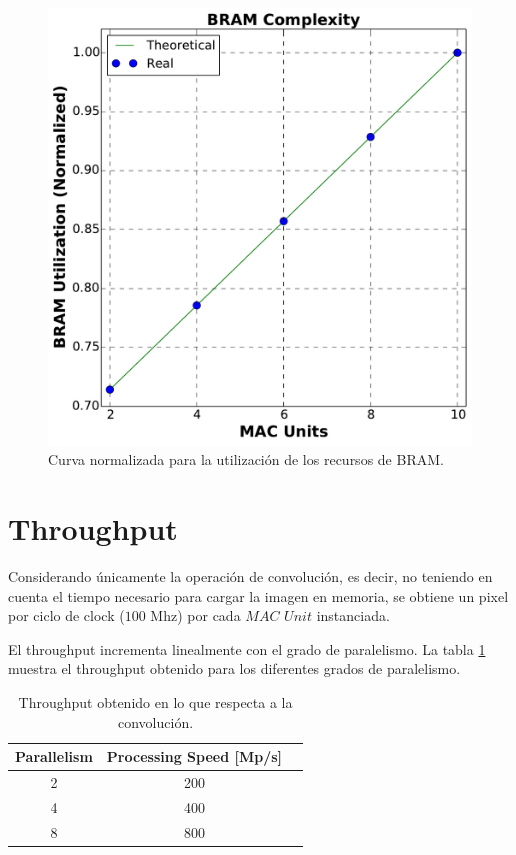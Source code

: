 \begin{figure}
\centering
\includegraphics[scale=0.3]{BRAM_c2}
\caption{Curva normalizada para la utilización de los recursos de BRAM.}
\label{bram_n}
\end{figure}

\section{Throughput}

Considerando únicamente la operación de convolución, es decir, no teniendo en
cuenta el tiempo necesario para cargar la imagen en memoria, se obtiene un pixel
por ciclo de clock ($100$ Mhz) por cada $MAC$ $Unit$ instanciada. 

El throughput incrementa linealmente con el grado de paralelismo. La tabla
\ref{conv_tp} muestra el throughput obtenido para los diferentes grados de
paralelismo.

\begin{table}
\renewcommand{\arraystretch}{1.3}
\caption{Throughput obtenido en lo que respecta a la convolución.}
\label{conv_tp}
\centering
\begin{tabular}{|c|c|c|}
 \hline
  \textbf{Parallelism}  &    \textbf{Processing Speed [Mp/s]}  \\ \hline
          2             &                     200              \\ \hline
          4             &                     400              \\ \hline
          8             &                     800              \\ \hline
\end{tabular}           
\end{table}